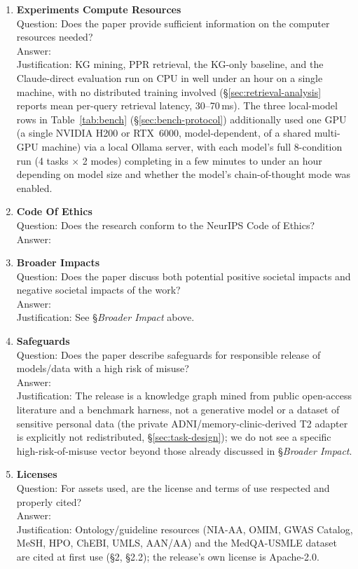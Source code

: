 \documentclass{article}
\begin{document}
\begin{enumerate}
\item \textbf{Experiments Compute Resources}\\
    Question: Does the paper provide sufficient information on the computer resources needed?\\
    Answer: \answerYes{}\\
    Justification: KG mining, PPR retrieval, the KG-only baseline, and the Claude-direct evaluation run on CPU in well under an hour on a single machine, with no distributed training involved (\S\ref{sec:retrieval-analysis} reports mean per-query retrieval latency, 30--70\,ms). The three local-model rows in Table~\ref{tab:bench} (\S\ref{sec:bench-protocol}) additionally used one GPU (a single NVIDIA H200 or RTX~6000, model-dependent, of a shared multi-GPU machine) via a local Ollama server, with each model's full 8-condition run (4 tasks $\times$ 2 modes) completing in a few minutes to under an hour depending on model size and whether the model's chain-of-thought mode was enabled.

\item \textbf{Code Of Ethics}\\
    Question: Does the research conform to the NeurIPS Code of Ethics?\\
    Answer: \answerYes{}

\item \textbf{Broader Impacts}\\
    Question: Does the paper discuss both potential positive societal impacts and negative societal impacts of the work?\\
    Answer: \answerYes{}\\
    Justification: See \S\emph{Broader Impact} above.

\item \textbf{Safeguards}\\
    Question: Does the paper describe safeguards for responsible release of models/data with a high risk of misuse?\\
    Answer: \answerNA{}\\
    Justification: The release is a knowledge graph mined from public open-access literature and a benchmark harness, not a generative model or a dataset of sensitive personal data (the private ADNI/memory-clinic-derived T2 adapter is explicitly not redistributed, \S\ref{sec:task-design}); we do not see a specific high-risk-of-misuse vector beyond those already discussed in \S\emph{Broader Impact}.

\item \textbf{Licenses}\\
    Question: For assets used, are the license and terms of use respected and properly cited?\\
    Answer: \answerYes{}\\
    Justification: Ontology/guideline resources (NIA-AA, OMIM, GWAS Catalog, MeSH, HPO, ChEBI, UMLS, AAN/AA) and the MedQA-USMLE dataset~\citep{jin2021medqa} are cited at first use (\S2, \S2.2); the release's own license is Apache-2.0.


\end{enumerate}
\end{document}
